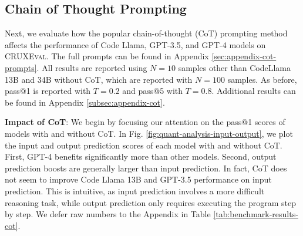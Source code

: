 \documentclass{article} %
\newcommand{\benchmark}{\textsc{CRUXEval}\xspace}
\begin{document}





\subsection{Chain of Thought Prompting} \label{subsec:cot}
Next, we evaluate how the popular chain-of-thought (CoT) prompting method \citep{wei2022chain} affects the performance of Code Llama, GPT-3.5, and GPT-4 models on \benchmark. The full prompts can be found in Appendix \ref{sec:appendix-cot-prompts}. All results are reported using $N=10$ samples other than CodeLlama 13B and 34B without CoT, which are reported with $N=100$ samples. As before, pass@1 is reported with $T=0.2$ and pass@5 with $T=0.8$. Additional results can be found in Appendix \ref{subsec:appendix-cot}.

\textbf{Impact of CoT}: We begin by focusing our attention on the pass@1 scores of models with and without CoT. In Fig. \ref{fig:quant-analysis-input-output}, we plot the input and output prediction scores of each model with and without CoT. First, GPT-4 benefits significantly more than other models. Second, output prediction boosts are generally larger than input prediction. In fact, CoT does not seem to improve Code Llama 13B and GPT-3.5 performance on input prediction. This is intuitive, as input prediction involves a more difficult reasoning task, while output prediction only requires executing the program step by step. We defer raw numbers to the Appendix in Table \ref{tab:benchmark-results-cot}.
\end{document}
